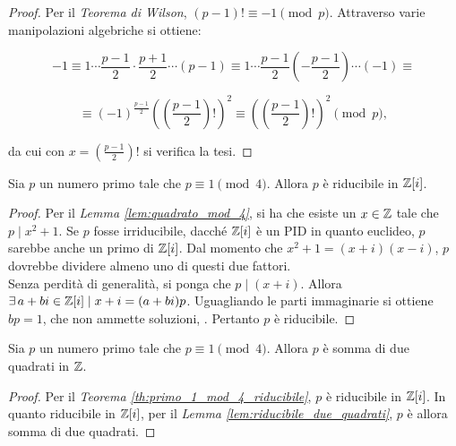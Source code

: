 \documentclass[11pt]{scrbook}
\begin{document}
\begin{proof}
    Per il \textit{Teorema di Wilson}, $(p-1)! \equiv -1 \pmod p$.
    Attraverso varie manipolazioni algebriche si ottiene:

    \[-1 \equiv 1 \cdots \frac{p-1}{2} \cdot \frac{p+1}{2} \cdots (p-1) \equiv 1 \cdots \frac{p-1}{2} \left(-\frac{p-1}{2}\right) \cdots (-1) \equiv\]

    \[ \equiv (-1)^{\frac{p-1}{2}} \left(\left( \frac{p-1}{2} \right)!\right)^2 \equiv
        \left(\left( \frac{p-1}{2} \right)!\right)^2 \pmod p,
    \]

    \vskip 0.1in

    da cui con $x = \left( \frac{p-1}{2} \right)!$ si verifica la
    tesi.
\end{proof}

\begin{theorem}
    \label{th:primo_1_mod_4_riducibile}
    Sia $p$ un numero primo tale che $p \equiv 1 \pmod4$. Allora
    $p$ è riducibile in $\mathbb{Z}[i]$.
\end{theorem}

\begin{proof}
    Per il \textit{Lemma \ref{lem:quadrato_mod_4}}, si ha che esiste
    un $x \in \mathbb Z$ tale che $p \mid x^2+1$. Se $p$ fosse irriducibile,
    dacché $\mathbb{Z}[i]$ è un PID in quanto euclideo, $p$ sarebbe anche un
    primo di $\mathbb{Z}[i]$. Dal momento che $x^2+1=(x+i)(x-i)$, $p$ dovrebbe
    dividere almeno uno di questi due fattori. \\

    Senza perdità di generalità, si ponga che $p \mid (x+i)$. Allora
    $\exists a+bi \in \ZZi \mid x+i=(a+bi)p$. Uguagliando le parti
    immaginarie si ottiene $bp=1$, che non ammette soluzioni, \Lightning{}. Pertanto $p$ è riducibile.
\end{proof}

\begin{corollary}
    \label{th:teorema_natale}
    Sia $p$ un numero primo tale che $p \equiv 1 \pmod4$. Allora
    $p$ è somma di due quadrati in $\mathbb Z$.
\end{corollary}

\begin{proof}
    Per il \textit{Teorema \ref{th:primo_1_mod_4_riducibile}},
    $p$ è riducibile in $\mathbb{Z}[i]$. In quanto riducibile in $\mathbb{Z}[i]$, per
    il \textit{Lemma \ref{lem:riducibile_due_quadrati}}, $p$ è allora
    somma di due quadrati.
\end{proof}
\end{document}
